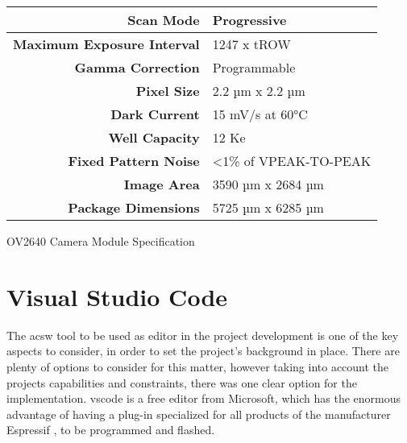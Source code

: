 \begin{table}[]
\begin{tabular}{|cc|l|}
		\multicolumn{2}{|r|}{\textbf{Scan Mode}}                                                                                                                  & Progressive                               \\ \hline
		\multicolumn{2}{|r|}{\textbf{Maximum Exposure Interval}}                                                                                                  & 1247 x tROW                               \\ \hline
		\multicolumn{2}{|r|}{\textbf{Gamma Correction}}                                                                                                           & Programmable                              \\ \hline
		\multicolumn{2}{|r|}{\textbf{Pixel Size}}                                                                                                                 & 2.2 µm x 2.2 µm                           \\ \hline
		\multicolumn{2}{|r|}{\textbf{Dark Current}}                                                                                                               & 15 mV/s at 60°C                           \\ \hline
		\multicolumn{2}{|r|}{\textbf{Well Capacity}}                                                                                                              & 12 Ke                                     \\ \hline
		\multicolumn{2}{|r|}{\textbf{Fixed Pattern Noise}}                                                                                                        & \textless{}1\% of VPEAK-TO-PEAK           \\ \hline
		\multicolumn{2}{|r|}{\textbf{Image Area}}                                                                                                                 & 3590 µm x 2684 µm                         \\ \hline
		\multicolumn{2}{|r|}{\textbf{Package Dimensions}}                                                                                                         & 5725 µm x 6285 µm                         \\ \hline
	\end{tabular}
\end{table}
\begin{center}
	{OV2640 Camera Module Specification}
\end{center}


\section{Visual Studio Code}
The ac{sw} tool to be used as editor in the project development is one of the key aspects to consider, in order to set the project's background in place. There are plenty of options to consider for this matter, however taking into account the projects capabilities and constraints, there was one clear option for the implementation. \ac{vscode} is a free editor from Microsoft, which has the enormous advantage of having a plug-in specialized for all products of the manufacturer Espressif \autocite{Espressif:2022}, to be programmed and flashed.

